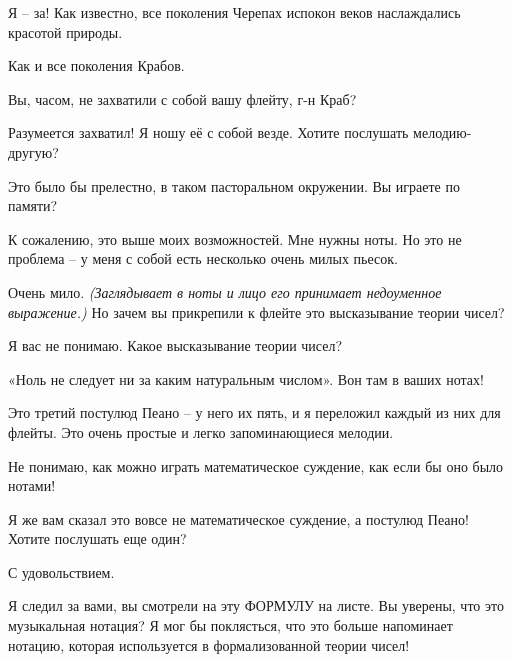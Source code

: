 \documentclass[../main.tex]{subfiles}
\begin{document}
\begin{dialogue}
 Я \--- за! Как известно, все поколения Черепах испокон веков наслаждались красотой природы.

 Как и все поколения Крабов.

 Вы, часом, не захватили с собой вашу флейту, г-н Краб?

 Разумеется захватил! Я ношу её с собой везде. Хотите послушать мелодию-другую?

 Это было бы прелестно, в таком пасторальном окружении. Вы играете по памяти?

 К сожалению, это выше моих возможностей. Мне нужны ноты. Но это не проблема \--- у меня с собой есть несколько очень милых пьесок.


 Очень мило. \emph{(Заглядывает в ноты и лицо его принимает недоуменное выражение.)} Но зачем вы прикрепили к флейте это высказывание теории чисел?


 Я вас не понимаю. Какое высказывание теории чисел?

 «Ноль не следует ни за каким натуральным числом». Вон там в ваших нотах!

 Это третий постулюд Пеано \--- у него их пять, и я переложил каждый из них для флейты. Это очень простые и легко запоминающиеся мелодии.

 Не понимаю, как можно играть математическое суждение, как если бы оно было нотами!

 Я же вам сказал это вовсе не математическое суждение, а постулюд Пеано! Хотите послушать еще один?

 С удовольствием.


Я следил за вами, вы смотрели на эту ФОРМУЛУ на листе. Вы уверены, что это музыкальная нотация? Я мог бы поклясться, что это больше напоминает нотацию, которая используется в формализованной теории чисел!


\end{dialogue}
\end{document}
